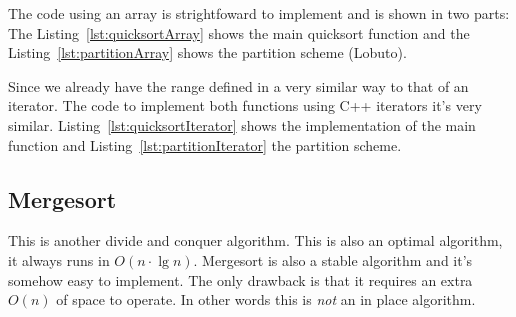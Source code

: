 The code using an array is strightfoward to implement and is shown in two parts: The Listing~\ref{lst:quicksortArray} shows the main quicksort function and the Listing~\ref{lst:partitionArray} shows the partition scheme (Lobuto).



Since we already have the range defined in a very similar way to that of an iterator. 
The code to implement both functions using C++ iterators it's very similar.
Listing~\ref{lst:quicksortIterator} shows the implementation of the main function and Listing~\ref{lst:partitionIterator} the partition scheme.



\subsection{Mergesort}

This is another divide and conquer algorithm.
This is also an optimal algorithm, it always runs in $O(n \cdot \lg n)$.
Mergesort is also a stable algorithm and it's somehow easy to implement.
The only drawback is that it requires an extra $O(n)$ of space to operate.
In other words this is \emph{not} an in place algorithm.

